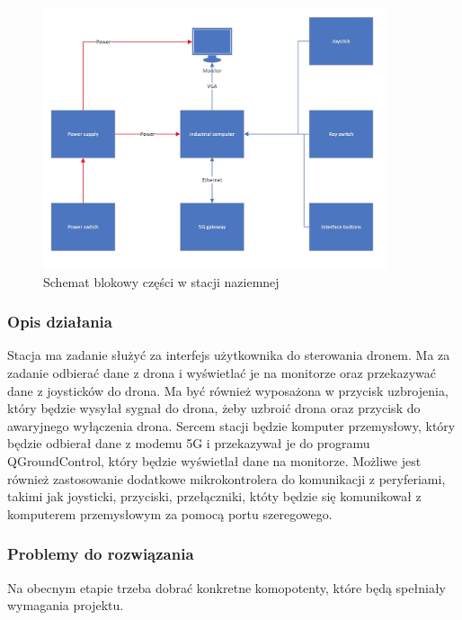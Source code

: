 \documentclass{article}
\begin{document}
\begin{figure}[H]
    \centering
    \includegraphics[width=0.9\textwidth]{stacja.jpg}
    \caption{Schemat blokowy części w stacji naziemnej}
\end{figure}

\subsubsection{Opis działania}
Stacja ma zadanie służyć za interfejs użytkownika do sterowania dronem.
Ma za zadanie odbierać dane z drona i wyświetlać je na monitorze oraz przekazywać dane z joysticków do drona.
Ma być również wyposażona w przycisk uzbrojenia, który będzie wysyłał sygnał do drona, żeby uzbroić drona oraz przycisk do awaryjnego wyłączenia drona.
Sercem stacji będzie komputer przemysłowy, który będzie odbierał dane z modemu 5G i przekazywał je do programu QGroundControl, który będzie wyświetlał dane na monitorze.
Możliwe jest również zastosowanie dodatkowe mikrokontrolera do komunikacji z peryferiami, takimi jak joysticki, przyciski, przełączniki, któty będzie się komunikował z komputerem przemysłowym za pomocą portu szeregowego.

\subsubsection{Problemy do rozwiązania}
Na obecnym etapie trzeba dobrać konkretne komopotenty, które będą spełniały wymagania projektu.
\end{document}
